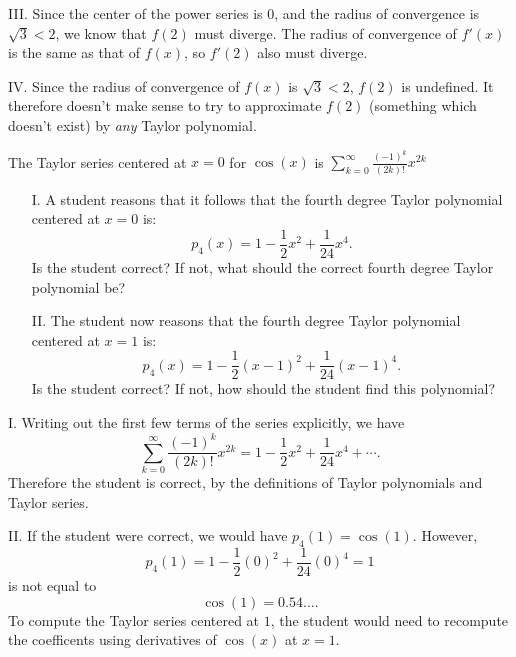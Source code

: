\documentclass[noauthor]{ximera}
\begin{document}
\begin{problem}
\begin{freeResponse}
III. Since the center of the power series is $0$, and the radius of convergence is $\sqrt{3} < 2$, we know that $f(2)$ must diverge. The radius of convergence of $f'(x)$ is the same as that of $f(x)$, so $f'(2)$ also must diverge.

IV. Since the radius of convergence of $f(x)$ is $\sqrt{3} < 2$, $f(2)$ is undefined. It therefore doesn't make sense to try to approximate $f(2)$ (something which doesn't exist) by \emph{any} Taylor polynomial.
\end{freeResponse}
\end{problem}


\begin{problem} 
The Taylor series centered at $x=0$ for $\cos(x)$ is $\displaystyle \sum_{k=0}^{\infty} \frac{(-1)^k}{(2k)!} x^{2k}$

\begin{itemize}
\item[I.]  A student reasons that it follows that the fourth degree Taylor polynomial centered at $x=0$ is: $$p_4(x) = 1-\dfrac{1}{2}x^2+\dfrac{1}{24}x^4.$$  Is the student correct?  If not, what should the correct fourth degree Taylor polynomial be?
\item[II.] The student now reasons that the fourth degree Taylor polynomial centered at $x=1$ is: $$p_4(x) = 1-\dfrac{1}{2}(x-1)^2+\dfrac{1}{24}(x-1)^4.$$  Is the student correct?  If not, how should the student find this polynomial?
\end{itemize}

\begin{freeResponse}
I. Writing out the first few terms of the series explicitly, we have
$$
\sum_{k=0}^{\infty} \frac{(-1)^k}{(2k)!} x^{2k} = 1 - \frac{1}{2} x^2 + \frac{1}{24}x^4 + \cdots.
$$
Therefore the student is correct, by the definitions of Taylor polynomials and Taylor series.

II. If the student were correct, we would have $p_4(1) = \cos(1)$. However,
$$
p_4(1) = 1 - \frac{1}{2}(0)^2 + \frac{1}{24}(0)^4 = 1
$$
is not equal to 
$$
\cos(1) = 0.54\ldots.
$$
To compute the Taylor series centered at $1$, the student would need to recompute the coefficents using derivatives of $\cos(x)$ at $x=1$. 
\end{freeResponse}
\end{problem}
\end{document}

